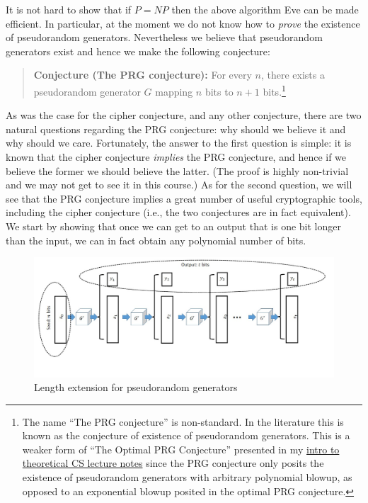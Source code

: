 It is not hard to show that if \(P=\ensuremath{\mathit{NP}}\) then the
above algorithm Eve can be made efficient. In particular, at the moment
we do not know how to \emph{prove} the existence of pseudorandom
generators. Nevertheless we believe that pseudorandom generators exist
and hence we make the following conjecture:

\begin{quote}
\textbf{Conjecture (The PRG conjecture):} For every \(n\), there exists
a pseudorandom generator \(G\) mapping \(n\) bits to \(n+1\)
bits.\footnote{The name ``The PRG conjecture'' is non-standard. In the
  literature this is known as the conjecture of existence of
  pseudorandom generators. This is a weaker form of ``The Optimal PRG
  Conjecture'' presented in my \href{https://goo.gl/G7bU4M}{intro to
  theoretical CS lecture notes} since the PRG conjecture only posits the
  existence of pseudorandom generators with arbitrary polynomial blowup,
  as opposed to an exponential blowup posited in the optimal PRG
  conjecture.}
\end{quote}

As was the case for the cipher conjecture, and any other conjecture,
there are two natural questions regarding the PRG conjecture: why should
we believe it and why should we care. Fortunately, the answer to the
first question is simple: it is known that the cipher conjecture
\emph{implies} the PRG conjecture, and hence if we believe the former we
should believe the latter. (The proof is highly non-trivial and we may
not get to see it in this course.) As for the second question, we will
see that the PRG conjecture implies a great number of useful
cryptographic tools, including the cipher conjecture (i.e., the two
conjectures are in fact equivalent). We start by showing that once we
can get to an output that is one bit longer than the input, we can in
fact obtain any polynomial number of bits.

\hypertarget{lengthextendprgthm}{}

\begin{figure}
\centering
\includegraphics[width=\textwidth, height=0.25\paperheight, keepaspectratio]{../figure/length-extension-prg.jpg}
\caption{Length extension for pseudorandom generators}
\label{lengthextendprgfig}
\end{figure}

